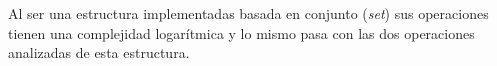 Al ser una estructura implementadas basada en conjunto (\emph{set}) sus operaciones tienen una complejidad logarítmica y lo mismo pasa con las dos operaciones analizadas de esta estructura.